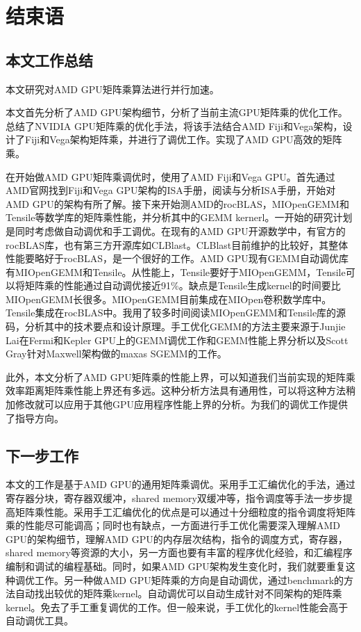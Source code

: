 \chapter{结束语}\label{chap:Conclusion}

\section{本文工作总结}
本文研究对AMD GPU矩阵乘算法进行并行加速。 

本文首先分析了AMD GPU架构细节，分析了当前主流GPU矩阵乘的优化工作。总结了NVIDIA GPU矩阵乘的优化手法，将该手法结合AMD Fiji和Vega架构，设计了Fiji和Vega架构矩阵乘，并进行了调优工作。实现了AMD GPU高效的矩阵乘。

在开始做AMD GPU矩阵乘调优时，使用了AMD Fiji和Vega GPU。首先通过AMD官网找到Fiji和Vega GPU架构的ISA手册，阅读与分析ISA手册，开始对AMD GPU的架构有所了解。接下来开始测AMD的rocBLAS，MIOpenGEMM和Tensile等数学库的矩阵乘性能，并分析其中的GEMM kernerl。一开始的研究计划是同时考虑做自动调优和手工调优。在现有的AMD GPU开源数学中，有官方的rocBLAS库，也有第三方开源库如CLBlast。CLBlast目前维护的比较好，其整体性能要略好于rocBLAS，是一个很好的工作。AMD GPU现有GEMM自动调优库有MIOpenGEMM和Tensile。从性能上，Tensile要好于MIOpenGEMM，Tensile可以将矩阵乘的性能通过自动调优接近91\%。缺点是Tensile生成kernel的时间要比MIOpenGEMM长很多。MIOpenGEMM目前集成在MIOpen卷积数学库中。Tensile集成在rocBLAS中。我用了较多时间阅读MIOpenGEMM和Tensile库的源码，分析其中的技术要点和设计原理。手工优化GEMM的方法主要来源于Junjie Lai在Fermi和Kepler GPU上的GEMM调优工作和GEMM性能上界分析以及Scott Gray针对Maxwell架构做的maxas SGEMM的工作。

此外，本文分析了AMD GPU矩阵乘的性能上界，可以知道我们当前实现的矩阵乘效率距离矩阵乘性能上界还有多远。这种分析方法具有通用性，可以将这种方法稍加修改就可以应用于其他GPU应用程序性能上界的分析。为我们的调优工作提供了指导方向。

\section{下一步工作}
本文的工作是基于AMD GPU的通用矩阵乘调优。采用手工汇编优化的手法，通过寄存器分块，寄存器双缓冲，shared memory双缓冲等，指令调度等手法一步步提高矩阵乘性能。采用手工汇编优化的优点是可以通过十分细粒度的指令调度将矩阵乘的性能尽可能调高；同时也有缺点，一方面进行手工优化需要深入理解AMD GPU的架构细节，理解AMD GPU的内存层次结构，指令的调度方式，寄存器，shared memory等资源的大小，另一方面也要有丰富的程序优化经验，和汇编程序编制和调试的编程基础。同时，如果AMD GPU架构发生变化时，我们就要重复这种调优工作。另一种做AMD GPU矩阵乘的方向是自动调优，通过benchmark的方法自动找出较优的矩阵乘kernel。自动调优可以自动生成针对不同架构的矩阵乘kernel。免去了手工重复调优的工作。但一般来说，手工优化的kernel性能会高于自动调优工具。


